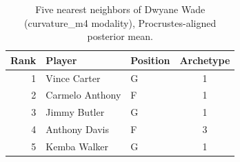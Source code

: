 \begin{table}[htbp]
  \centering\small
  \begin{tabular}{rllc}
    \toprule
    Rank & Player & Position & Archetype \\
    \midrule
    1 & Vince Carter & G & 1 \\
    2 & Carmelo Anthony & F & 1 \\
    3 & Jimmy Butler & G & 1 \\
    4 & Anthony Davis & F & 3 \\
    5 & Kemba Walker & G & 1 \\
    \bottomrule
  \end{tabular}
  \caption{Five nearest neighbors of Dwyane Wade (curvature_m4 modality), Procrustes-aligned posterior mean.}
  \label{tab:Dwyane_Wade_neighbors_curvature_m4}
\end{table}

